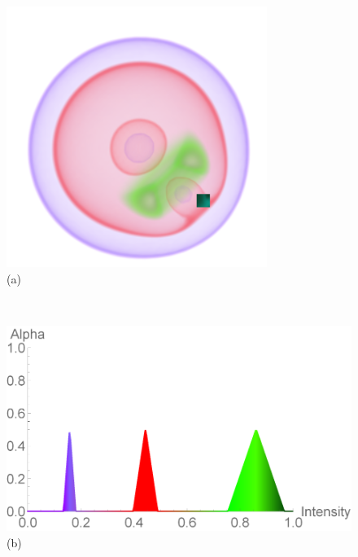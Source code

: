 \documentclass[twoside,twocolumn,10pt]{article}
\begin{document}
\begin{figure}[t]
	\centering
	\begin{minipage}{.1\textwidth}
		\centering
		\includegraphics[width=1\linewidth]{nucleon_crop}\\
		(a)%
		\label{fig:nucleon}
	\end{minipage}~
	\begin{minipage}{.13\textwidth}
		\centering
		\includegraphics[width=1\linewidth]{tf_nucleon}\\
		(b)%
		\label{fig:tf_nucleon}
	\end{minipage}~

\end{figure}
\end{document}
